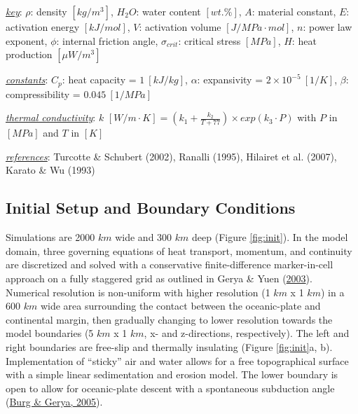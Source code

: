 \begin{landscape}
\begin{table}
{\begin{threeparttable}
\begin{tabular}[t]{lrrlrrrrrrrrlr}
\bottomrule
\end{tabular}
\begin{tablenotes}
\item \uline{\textit{key}}: $\rho$: density $[kg/m^3]$, $H_2O$: water content $[wt.\%]$, $A$: material constant, $E$: activation energy $[kJ/mol]$, $V$: activation volume $[J/MPa\cdot mol]$, $n$: power law exponent, $\phi$: internal friction angle, $\sigma_{crit}$: critical stress $[MPa]$, $H$: heat production $[\mu W/m^3]$
\item \uline{\textit{constants}}: $C_p$: heat capacity = $1~[kJ/kg]$, $\alpha$: expansivity = $2\times 10^{-5}~[1/K]$, $\beta$: compressibility = $0.045~[1/MPa]$
\item \uline{\textit{thermal conductivity}}: $k$ $[W/m \cdot K]=(k_1+\frac{k_2}{T+77})\times exp(k_3 \cdot P)$ with $P$ in $[MPa]$ and $T$ in $[K]$
\item \uline{\textit{references}}: Turcotte \& Schubert (2002), Ranalli (1995), Hilairet et al. (2007), Karato \& Wu (1993)
\end{tablenotes}
\end{threeparttable}}
\end{table}
\end{landscape}

\hypertarget{numBCs}{%
\subsection{Initial Setup and Boundary Conditions}\label{numBCs}}

Simulations are 2000 \(km\) wide and 300 \(km\) deep (Figure \ref{fig:init}). In the model domain, three governing equations of heat transport, momentum, and continuity are discretized and solved with a conservative finite-difference marker-in-cell approach on a fully staggered grid as outlined in Gerya \& Yuen (\protect\hyperlink{ref-gerya2003}{2003}). Numerical resolution is non-uniform with higher resolution (1 \(km\) x 1 \(km\)) in a 600 \(km\) wide area surrounding the contact between the oceanic-plate and continental margin, then gradually changing to lower resolution towards the model boundaries (5 \(km\) x 1 \(km\), x- and z-directions, respectively). The left and right boundaries are free-slip and thermally insulating (Figure \ref{fig:init}a, b). Implementation of ``sticky'' air and water allows for a free topographical surface with a simple linear sedimentation and erosion model. The lower boundary is open to allow for oceanic-plate descent with a spontaneous subduction angle (\protect\hyperlink{ref-burg2005}{Burg \& Gerya, 2005}).

